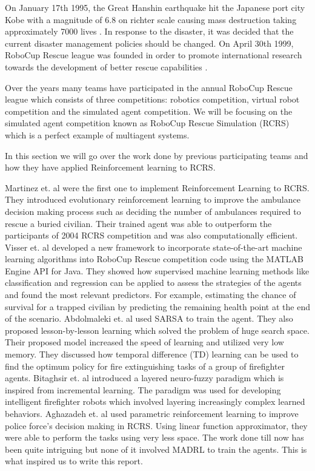 \documentclass[12pt]{report}
\begin{document}
On January 17th 1995, the Great Hanshin earthquake hit the Japanese port city Kobe with a magnitude of 6.8 on richter scale causing mass destruction taking approximately 7000 lives \cite{Bilski} \cite{RoboCup}. In response to the disaster, it was decided that the current disaster management policies should be changed. On April 30th 1999, RoboCup Rescue league was founded in order to promote international research towards the development of better rescue capabilities \cite{Bilski}.   

Over the years many teams have participated in the annual RoboCup Rescue league which consists of three competitions: robotics competition, virtual robot competition and the simulated agent competition. We will be focusing on the simulated agent competition known as RoboCup Rescue Simulation (RCRS) which is a perfect example of multiagent systems. 

In this section we will go over the work done by previous participating teams and how they have applied Reinforcement learning to RCRS. 

Martinez et. al \cite{Martinez} were the first one to implement Reinforcement Learning to RCRS. They introduced evolutionary reinforcement learning to improve the ambulance decision making process such as deciding the number of ambulances required to rescue a buried civilian. Their trained agent was able to outperform the participants of 2004 RCRS competition and was also computationally efficient. Visser et. al \cite{Visser2018RoboCupRS} developed a new framework to incorporate state-of-the-art machine learning algorithms into RoboCup Rescue competition code using the MATLAB Engine API for Java. They showed how supervised machine learning methods like classification and regression can be applied to assess the strategies of the agents and found the most relevant predictors. For example, estimating the chance of survival for a trapped civilian by predicting the remaining health point at the end of the scenario. Abdolmaleki et. al \cite{abdolmaleki} used SARSA to train the agent. They also proposed lesson-by-lesson learning which solved the problem of huge search space. Their proposed model increased the speed of learning and utilized very low memory. They discussed how temporal difference (TD) learning can be used to find the optimum policy for fire extinguishing tasks of a group of firefighter agents. Bitaghsir et. al \cite{Bitaghsir} introduced a layered neuro-fuzzy paradigm which is inspired from incremental learning. The paradigm was used for developing intelligent firefighter robots which involved layering increasingly complex learned behaviors. Aghazadeh et. al \cite{Aghazadeh} used parametric reinforcement learning to improve police force's decision making in RCRS. Using linear function approximator, they were able to perform the tasks using very less space. The work done till now has been quite intriguing but none of it involved MADRL to train the agents. This is what inspired us to write this report. 
\end{document}
